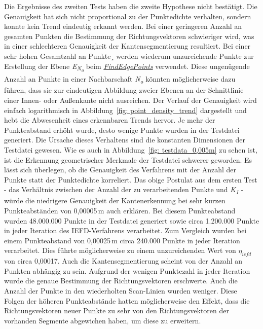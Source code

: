 Die Ergebnisse des zweiten Tests haben die zweite Hypothese nicht bestätigt. Die Genauigkeit hat sich nicht proportional zu der Punktedichte verhalten, sondern konnte kein Trend eindeutig erkannt werden. Bei einer geringeren Anzahl an gesamten Punkten die Bestimmung der Richtungsvektoren schwieriger wird, was in einer schlechteren Genauigkeit der Kantensegmentierung resultiert. Bei einer sehr hohen Gesamtzahl an Punkte¸ werden wiederum unzureichende Punkte zur Erstellung der Ebene \textit{E\textsubscript{N\textsubscript{o}}} beim \textit{\hyperref[alg:find_edge_points]{FindEdgePoints}} verwendet. Diese ungenügende Anzahl an Punkte in einer Nachbarschaft \textit{N\textsubscript{o}} könnten möglicherweise dazu führen, dass sie zur eindeutigen Abbildung zweier Ebenen an der Schnittlinie einer Innen- oder Außenkante nicht ausreichen. Der Verlauf der Genauigkeit wird einfach logarithmisch in Abbildung~\ref{fig: point_density_trend} dargestellt und hebt die Abwesenheit eines erkennbaren Trends hervor. Je mehr der Punkteabstand erhöht wurde, desto wenige Punkte wurden in der Testdatei generiert. Die Ursache dieses Verhaltens sind die konstanten Dimensionen der Testdatei gewesen. Wie es auch in Abbildung~\ref{fig: testdata_0,005m} zu sehen ist, ist die Erkennung geometrischer Merkmale der Testdatei schwerer geworden. Es lässt sich überlegen, ob die Genauigkeit des Verfahrens mit der Anzahl der Punkte statt der Punktedichte korreliert. Das obige Postulat aus dem ersten Test - das Verhältnis zwischen der Anzahl der zu verarbeitenden Punkte und \textit{K\textsubscript{1}} - würde die niedrigere Genauigkeit der Kantenerkennung bei sehr kurzen Punkteabständen von 0,00005\,\si{\m} auch erklären. Bei diesem Punkteabstand wurden 48.000.000 Punkte in der Testdatei generiert sowie circa 1.200.000 Punkte in jeder Iteration des IEFD-Verfahrens verarbeitet. Zum Vergleich wurden bei einem Punkteabstand von 0,00025\,\si{\m} circa 240.000 Punkte in jeder Iteration verarbeitet. Dies führte möglicherweise zu einem unzureichenden Wert von $\eta_{iefd}$ von circa 0,00017. Auch die Kantensegmentierung scheint von der Anzahl an Punkten abhängig zu sein. Aufgrund der wenigen Punktezahl in jeder Iteration  wurde die genaue Bestimmung der Richtungsvektoren erschwerte. Auch die Anzahl der Punkte in den wiederholten Scan-Linien wurden weniger. Diese Folgen der höheren Punkteabstände hatten möglicherweise den Effekt, dass die Richtungsvektoren neuer Punkte zu sehr von den Richtungsvektoren der vorhanden Segmente abgewichen haben, um diese zu erweitern. 


